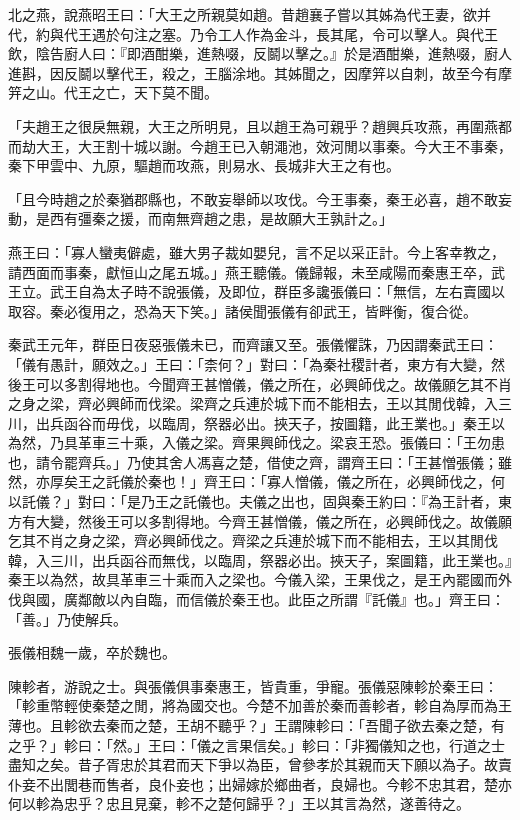 \begin{pinyinscope}
北之燕，說燕昭王曰：「大王之所親莫如趙。昔趙襄子嘗以其姊為代王妻，欲并代，約與代王遇於句注之塞。乃令工人作為金斗，長其尾，令可以擊人。與代王飲，陰告廚人曰：『即酒酣樂，進熱啜，反鬬以擊之。』於是酒酣樂，進熱啜，廚人進斟，因反鬬以擊代王，殺之，王腦涂地。其姊聞之，因摩笄以自刺，故至今有摩笄之山。代王之亡，天下莫不聞。

「夫趙王之很戾無親，大王之所明見，且以趙王為可親乎？趙興兵攻燕，再圍燕都而劫大王，大王割十城以謝。今趙王已入朝澠池，效河閒以事秦。今大王不事秦，秦下甲雲中、九原，驅趙而攻燕，則易水、長城非大王之有也。

「且今時趙之於秦猶郡縣也，不敢妄舉師以攻伐。今王事秦，秦王必喜，趙不敢妄動，是西有彊秦之援，而南無齊趙之患，是故願大王孰計之。」

燕王曰：「寡人蠻夷僻處，雖大男子裁如嬰兒，言不足以采正計。今上客幸教之，請西面而事秦，獻恒山之尾五城。」燕王聽儀。儀歸報，未至咸陽而秦惠王卒，武王立。武王自為太子時不說張儀，及即位，群臣多讒張儀曰：「無信，左右賣國以取容。秦必復用之，恐為天下笑。」諸侯聞張儀有卻武王，皆畔衡，復合從。

秦武王元年，群臣日夜惡張儀未已，而齊讓又至。張儀懼誅，乃因謂秦武王曰：「儀有愚計，願效之。」王曰：「柰何？」對曰：「為秦社稷計者，東方有大變，然後王可以多割得地也。今聞齊王甚憎儀，儀之所在，必興師伐之。故儀願乞其不肖之身之梁，齊必興師而伐梁。梁齊之兵連於城下而不能相去，王以其閒伐韓，入三川，出兵函谷而毋伐，以臨周，祭器必出。挾天子，按圖籍，此王業也。」秦王以為然，乃具革車三十乘，入儀之梁。齊果興師伐之。梁哀王恐。張儀曰：「王勿患也，請令罷齊兵。」乃使其舍人馮喜之楚，借使之齊，謂齊王曰：「王甚憎張儀；雖然，亦厚矣王之託儀於秦也！」齊王曰：「寡人憎儀，儀之所在，必興師伐之，何以託儀？」對曰：「是乃王之託儀也。夫儀之出也，固與秦王約曰：『為王計者，東方有大變，然後王可以多割得地。今齊王甚憎儀，儀之所在，必興師伐之。故儀願乞其不肖之身之梁，齊必興師伐之。齊梁之兵連於城下而不能相去，王以其閒伐韓，入三川，出兵函谷而無伐，以臨周，祭器必出。挾天子，案圖籍，此王業也。』秦王以為然，故具革車三十乘而入之梁也。今儀入梁，王果伐之，是王內罷國而外伐與國，廣鄰敵以內自臨，而信儀於秦王也。此臣之所謂『託儀』也。」齊王曰：「善。」乃使解兵。

張儀相魏一歲，卒於魏也。

陳軫者，游說之士。與張儀俱事秦惠王，皆貴重，爭寵。張儀惡陳軫於秦王曰：「軫重幣輕使秦楚之閒，將為國交也。今楚不加善於秦而善軫者，軫自為厚而為王薄也。且軫欲去秦而之楚，王胡不聽乎？」王謂陳軫曰：「吾聞子欲去秦之楚，有之乎？」軫曰：「然。」王曰：「儀之言果信矣。」軫曰：「非獨儀知之也，行道之士盡知之矣。昔子胥忠於其君而天下爭以為臣，曾參孝於其親而天下願以為子。故賣仆妾不出閭巷而售者，良仆妾也；出婦嫁於鄉曲者，良婦也。今軫不忠其君，楚亦何以軫為忠乎？忠且見棄，軫不之楚何歸乎？」王以其言為然，遂善待之。


\end{pinyinscope}
